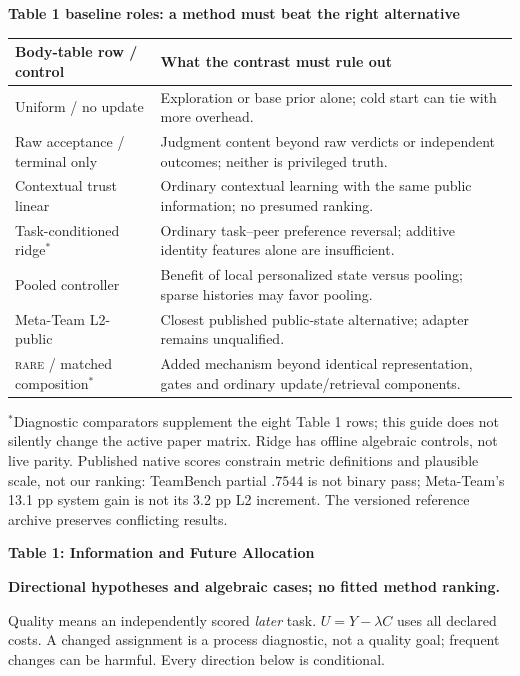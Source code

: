 \documentclass[10pt,a4paper]{article}
\newcommand{\lead}[1]{\vspace{4pt}\textbf{#1}\par}
\newcommand{\rare}{\textsc{rare}}
\newcommand{\caution}{\textcolor{red!70!black}{\textbf{Directional hypotheses and algebraic cases; no fitted method ranking.}}\par}
\begin{document}
\lead{Table 1 baseline roles: a method must beat the right alternative}
\begin{center}\small
\begin{tabularx}{\linewidth}{@{}L{.27\linewidth}X@{}}\toprule
Body-table row / control & What the contrast must rule out\\\midrule
Uniform / no update & Exploration or base prior alone; cold start can tie with more overhead.\\
Raw acceptance / terminal only & Judgment content beyond raw verdicts or independent outcomes; neither is privileged truth.\\
Contextual trust linear & Ordinary contextual learning with the same public information; no presumed ranking.\\
Task-conditioned ridge$^{*}$ & Ordinary task--peer preference reversal; additive identity features alone are insufficient.\\
Pooled controller & Benefit of local personalized state versus pooling; sparse histories may favor pooling.\\
Meta-Team L2-public & Closest published public-state alternative; adapter remains unqualified.\\
\rare{} / matched composition$^{*}$ & Added mechanism beyond identical representation, gates and ordinary update/retrieval components.\\\bottomrule
\end{tabularx}\end{center}
\footnotesize $^{*}$Diagnostic comparators supplement the eight Table 1 rows;
this guide does not silently change the active paper matrix. Ridge has offline
algebraic controls, not live parity. Published native scores constrain metric
definitions and plausible scale, not our ranking: TeamBench partial $.7544$ is
not binary pass; Meta-Team's 13.1 pp system gain is not its 3.2 pp L2 increment.
The versioned reference archive preserves conflicting results.\normalsize

\clearpage
{\large\bfseries Table 1: Information and Future Allocation}\par\caution
Quality means an independently scored \emph{later} task. $U=Y-\lambda C$ uses
all declared costs. A changed assignment is a process diagnostic, not a quality
goal; frequent changes can be harmful. Every direction below is conditional.
\end{document}
